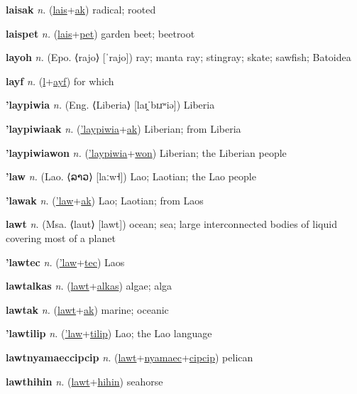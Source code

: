 \textbf{\hypertarget{laisak}{laisak}} \textit{n.} (\hyperlink{lais}{lais}+\allowbreak \hyperlink{ak}{ak})
radical; rooted

\textbf{\hypertarget{laispet}{laispet}} \textit{n.} (\hyperlink{lais}{lais}+\allowbreak \hyperlink{pet}{pet})
garden beet; beetroot

\textbf{\hypertarget{layoh}{layoh}} \textit{n.} (Epo. ⟨rajo⟩ [ˈrajo])
ray; manta ray; stingray; skate; sawfish; Batoidea

\textbf{\hypertarget{layf}{layf}} \textit{n.} (\hyperlink{l}{l}+\allowbreak \hyperlink{ayf}{ayf})
for which

\textbf{\hypertarget{'laypiwia}{'laypiwia}} \textit{n.} (Eng. ⟨Liberia⟩ [laɪ̯ˈbɪɹʷiə])
Liberia

\textbf{\hypertarget{'laypiwiaak}{'laypiwiaak}} \textit{n.} (\hyperlink{'laypiwia}{'laypiwia}+\allowbreak \hyperlink{ak}{ak})
Liberian; from Liberia

\textbf{\hypertarget{'laypiwiawon}{'laypiwiawon}} \textit{n.} (\hyperlink{'laypiwia}{'laypiwia}+\allowbreak \hyperlink{won}{won})
Liberian; the Liberian people

\textbf{\hypertarget{'law}{'law}} \textit{n.} (Lao. ⟨{\lao{}ລາວ}⟩ [laːw˧])
Lao; Laotian; the Lao people

\textbf{\hypertarget{'lawak}{'lawak}} \textit{n.} (\hyperlink{'law}{'law}+\allowbreak \hyperlink{ak}{ak})
Lao; Laotian; from Laos

\textbf{\hypertarget{lawt}{lawt}} \textit{n.} (Msa. ⟨laut⟩ [lawt])
ocean; sea; large interconnected bodies of liquid covering most of a planet

\textbf{\hypertarget{'lawtec}{'lawtec}} \textit{n.} (\hyperlink{'law}{'law}+\allowbreak \hyperlink{tec}{tec})
Laos

\textbf{\hypertarget{lawtalkas}{lawtalkas}} \textit{n.} (\hyperlink{lawt}{lawt}+\allowbreak \hyperlink{alkas}{alkas})
algae; alga

\textbf{\hypertarget{lawtak}{lawtak}} \textit{n.} (\hyperlink{lawt}{lawt}+\allowbreak \hyperlink{ak}{ak})
marine; oceanic

\textbf{\hypertarget{'lawtilip}{'lawtilip}} \textit{n.} (\hyperlink{'law}{'law}+\allowbreak \hyperlink{tilip}{tilip})
Lao; the Lao language

\textbf{\hypertarget{lawtnyamaeccipcip}{lawtnyamaeccipcip}} \textit{n.} (\hyperlink{lawt}{lawt}+\allowbreak \hyperlink{nyamaec}{nyamaec}+\allowbreak \hyperlink{cipcip}{cipcip})
pelican

\textbf{\hypertarget{lawthihin}{lawthihin}} \textit{n.} (\hyperlink{lawt}{lawt}+\allowbreak \hyperlink{hihin}{hihin})
seahorse

